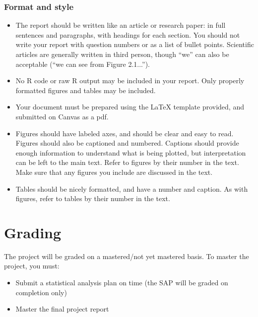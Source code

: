 \documentclass[11pt]{article}
\begin{document}
\subsubsection*{Format and style}

\begin{itemize}
\item The report should be written like an article or research paper: in full sentences and paragraphs, with headings for each section. You should not write your report with question numbers or as a list of bullet points. Scientific articles are generally written in third person, though ``we'' can also be acceptable (``we can see from Figure 2.1...'').

\item No R code or raw R output may be included in your report. Only properly formatted figures and tables may be included.

\item Your document must be prepared using the LaTeX template provided, and submitted on Canvas as a pdf.

\item Figures should have labeled axes, and should be clear and easy to read. Figures should also be captioned and numbered. Captions should provide enough information to understand what is being plotted, but interpretation can be left to the main text. Refer to figures by their number in the text. Make sure that any figures you include are discussed in the text.

\item Tables should be nicely formatted, and have a number and caption. As with figures, refer to tables by their number in the text.
\end{itemize}

\section*{Grading}

The project will be graded on a mastered/not yet mastered basis. To master the project, you must:
\begin{itemize}
\item Submit a statistical analysis plan on time (the SAP will be graded on completion only)
\item Master the final project report
\end{itemize}
\end{document}
